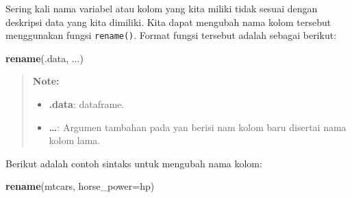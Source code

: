 \documentclass[]{book}
\newenvironment{Shaded}{\begin{snugshade}}{\end{snugshade}}
\newcommand{\KeywordTok}[1]{\textcolor[rgb]{0.13,0.29,0.53}{\textbf{#1}}}
\newcommand{\DataTypeTok}[1]{\textcolor[rgb]{0.13,0.29,0.53}{#1}}
\newcommand{\NormalTok}[1]{#1}
\providecommand{\tightlist}{%
  \setlength{\itemsep}{0pt}\setlength{\parskip}{0pt}}
\begin{document}
Sering kali nama variabel atau kolom yang kita miliki tidak sesuai
dengan deskripsi data yang kita dimiliki. Kita dapat mengubah nama kolom
tersebut menggunakan fungsi \texttt{rename()}. Format fungsi tersebut
adalah sebagai berikut:

\begin{Shaded}
\begin{Highlighting}[]
\KeywordTok{rename}\NormalTok{(.data, ...)}
\end{Highlighting}
\end{Shaded}

\begin{quote}
\textbf{Note: }

\begin{itemize}
\tightlist
\item
  \textbf{.data}: dataframe.
\item
  \textbf{\ldots{}}: Argumen tambahan pada yan berisi nam kolom baru
  disertai nama kolom lama.
\end{itemize}
\end{quote}

Berikut adalah contoh sintaks untuk mengubah nama kolom:

\begin{Shaded}
\begin{Highlighting}[]
\KeywordTok{rename}\NormalTok{(mtcars, }\DataTypeTok{horse_power=}\NormalTok{hp)}
\end{Highlighting}
\end{Shaded}
\end{document}
